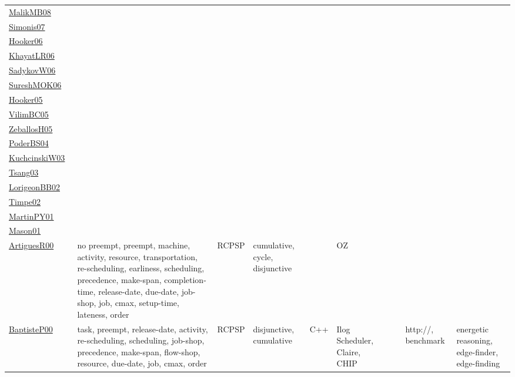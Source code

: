 {\begin{longtable}{p{3cm}p{4cm}p{2cm}p{2cm}p{2cm}p{2cm}p{2cm}p{2cm}p{2cm}p{2cm}}
\href{}{MalikMB08}~\cite{MalikMB08} &  &  &  &  &  &  &  &  & \\
\href{articles/Simonis07.pdf}{Simonis07}~\cite{Simonis07} &  &  &  &  &  &  &  &  & \\
\href{articles/Hooker06.pdf}{Hooker06}~\cite{Hooker06} &  &  &  &  &  &  &  &  & \\
\href{articles/KhayatLR06.pdf}{KhayatLR06}~\cite{KhayatLR06} &  &  &  &  &  &  &  &  & \\
\href{}{SadykovW06}~\cite{SadykovW06} &  &  &  &  &  &  &  &  & \\
\href{}{SureshMOK06}~\cite{SureshMOK06} &  &  &  &  &  &  &  &  & \\
\href{articles/Hooker05.pdf}{Hooker05}~\cite{Hooker05} &  &  &  &  &  &  &  &  & \\
\href{articles/VilimBC05.pdf}{VilimBC05}~\cite{VilimBC05} &  &  &  &  &  &  &  &  & \\
\href{articles/ZeballosH05.pdf}{ZeballosH05}~\cite{ZeballosH05} &  &  &  &  &  &  &  &  & \\
\href{articles/PoderBS04.pdf}{PoderBS04}~\cite{PoderBS04} &  &  &  &  &  &  &  &  & \\
\href{articles/KuchcinskiW03.pdf}{KuchcinskiW03}~\cite{KuchcinskiW03} &  &  &  &  &  &  &  &  & \\
\href{articles/Tsang03.pdf}{Tsang03}~\cite{Tsang03} &  &  &  &  &  &  &  &  & \\
\href{}{LorigeonBB02}~\cite{LorigeonBB02} &  &  &  &  &  &  &  &  & \\
\href{articles/Timpe02.pdf}{Timpe02}~\cite{Timpe02} &  &  &  &  &  &  &  &  & \\
\href{articles/MartinPY01.pdf}{MartinPY01}~\cite{MartinPY01} &  &  &  &  &  &  &  &  & \\
\href{articles/Mason01.pdf}{Mason01}~\cite{Mason01} &  &  &  &  &  &  &  &  & \\
\href{articles/ArtiguesR00.pdf}{ArtiguesR00}~\cite{ArtiguesR00} & no preempt, preempt, machine, activity, resource, transportation, re-scheduling, earliness, scheduling, precedence, make-span, completion-time, release-date, due-date, job-shop, job, cmax, setup-time, lateness, order & RCPSP & cumulative, cycle, disjunctive &  & OZ &  &  &  & \\
\href{articles/BaptisteP00.pdf}{BaptisteP00}~\cite{BaptisteP00} & task, preempt, release-date, activity, re-scheduling, scheduling, job-shop, precedence, make-span, flow-shop, resource, due-date, job, cmax, order & RCPSP & disjunctive, cumulative & C++ & Ilog Scheduler, Claire, CHIP &  &  & http://, benchmark & energetic reasoning, edge-finder, edge-finding\\

\end{longtable}}
